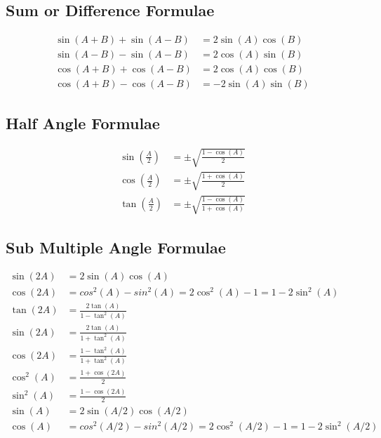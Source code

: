 \subsection{Sum or Difference Formulae}
\begin{align*}
\sin(A+B) + \sin(A-B) &=  2\sin(A)\cos(B)\\
\sin(A-B) - \sin(A-B) &=  2\cos(A)\sin(B)\\  
\cos(A+B) + \cos(A-B) &=  2\cos(A)\cos(B)\\   
\cos(A+B) - \cos(A-B) &= -2\sin(A)\sin(B)   
\end{align*}

\subsection{Half Angle Formulae}
\begin{align*}
\sin (\frac{A}{2}) &= \pm\sqrt{\frac{1-\cos(A)}{2}}\\
\cos (\frac{A}{2}) &= \pm\sqrt{\frac{1+\cos(A)}{2}}\\
\tan (\frac{A}{2}) &= \pm\sqrt{\frac{1-\cos(A)}{1+\cos(A)}}
\end{align*}

\vspace{-3mm} %

\subsection{Sub Multiple Angle Formulae}
\begin{align*}
\sin (2A) &= 2\sin(A)\cos(A)\\
\cos (2A) &= cos^{2}(A) - sin^{2}(A) = 2\cos^2(A) - 1 = 1 - 2\sin^2(A)\\
\tan(2A) &= \frac{2\tan(A)}{1-\tan^2(A)}\\
\sin(2A) &= \frac{2\tan(A)}{1+\tan^2(A)}\\
\cos(2A) &= \frac{1-\tan^2(A)}{1+\tan^2(A)}\\
\cos^2(A) &= \frac{1+\cos(2A)}{2}\\
\sin^2(A) &= \frac{1-\cos(2A)}{2}\\
\sin(A) &= 2\sin(A/2)\cos(A/2)\\
\cos (A) &= cos^{2}(A/2) - sin^{2}(A/2) = 2\cos^2(A/2) - 1 = 1 - 2\sin^2(A/2)
\end{align*}

